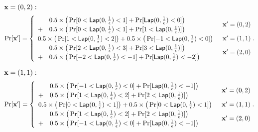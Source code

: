 \documentclass{article}
\begin{document}
{{\scriptsize
\noindent $\textbf{x} = (0,2):$
\[
\Pr[\textbf{x}']
= \begin{cases}
\begin{array}{ll}
 	& 0.5 \times 
 	\big(
 	\Pr[	0	< \mathsf{Lap}(0, \frac{1}{\epsilon})	<	1] 
 	+ 
 	\Pr[	\mathsf{Lap}(0, \frac{1}{\epsilon})			<	0] 
 	\big) \\
 	+ 	
 	& 0.5 \times 
 	\big(
 	\Pr[	0	< \mathsf{Lap}(0, \frac{1}{\epsilon})	<	1] 
 	+ 
 	\Pr[	1 	< \mathsf{Lap}(0, \frac{1}{\epsilon})] 
 	\big) 
\end{array} 
	& \textbf{x}' = (0, 2)\\
\begin{array}{ll}
 	0.5 \times 
 	\big(
 	\Pr[	1	< \mathsf{Lap}(0, \frac{1}{\epsilon})	<	2] 
 	\big)
 	+ 	
 	0.5 \times 
 	\big(
 	\Pr[	-1	< \mathsf{Lap}(0, \frac{1}{\epsilon})	<	0] 
 	\big) 
\end{array}  
	& \textbf{x}' = (1, 1)\\
\begin{array}{ll}
 	& 0.5 \times 
 	\big(
 	\Pr[	2	<	\mathsf{Lap}(0, \frac{1}{\epsilon})	<	3] 
 	+ 
 	\Pr[	3	<	\mathsf{Lap}(0, \frac{1}{\epsilon})]
 	\big) \\
 	+ 	
 	& 0.5 \times 
 	\big(
 	\Pr[	-2	< \mathsf{Lap}(0, \frac{1}{\epsilon})	<	-1] 
 	+ 
 	\Pr[	\mathsf{Lap}(0, \frac{1}{\epsilon})			<	-2] 
 	\big) 
\end{array}  
& \textbf{x}' = (2, 0)
\end{cases}.
\]


\noindent $\textbf{x} = (1,1):$
\[
\Pr[\textbf{x}']
= \begin{cases}
\begin{array}{ll}
 	& 0.5 \times 
 	\big(
 	\Pr[	-1	< \mathsf{Lap}(0, \frac{1}{\epsilon})	<	0] 
 	+ 
 	\Pr[	\mathsf{Lap}(0, \frac{1}{\epsilon})			<	-1] 
 	\big) \\
 	+ 	
 	& 0.5 \times 
 	\big(
 	\Pr[	1	< \mathsf{Lap}(0, \frac{1}{\epsilon})	<	2] 
 	+ 
 	\Pr[	2 	< \mathsf{Lap}(0, \frac{1}{\epsilon})] 
 	\big) 
\end{array} 
	& \textbf{x}' = (0, 2)\\
\begin{array}{ll}
 	0.5 \times 
 	\big(
 	\Pr[	0	< \mathsf{Lap}(0, \frac{1}{\epsilon})	<	1] 
 	\big)
 	+ 	
 	0.5 \times 
 	\big(
 	\Pr[	0	< \mathsf{Lap}(0, \frac{1}{\epsilon})	<	1] 
 	\big) 
\end{array}  
	& \textbf{x}' = (1, 1)\\
\begin{array}{ll}
 	& 0.5 \times 
 	\big(
 	\Pr[	1	<	\mathsf{Lap}(0, \frac{1}{\epsilon})	<	2] 
 	+ 
 	\Pr[	2	<	\mathsf{Lap}(0, \frac{1}{\epsilon})]
 	\big) \\
 	+ 	
 	& 0.5 \times 
 	\big(
 	\Pr[	-1	< \mathsf{Lap}(0, \frac{1}{\epsilon})	<	0] 
 	+ 
 	\Pr[	\mathsf{Lap}(0, \frac{1}{\epsilon})			<	-1] 
 	\big) 
\end{array}  
& \textbf{x}' = (2, 0)
\end{cases}.
\]

}}
\end{document}
